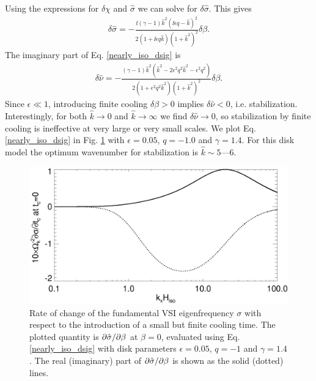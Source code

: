 Using the expressions for $\delta\chi$ and $\hat{\sigma}$ we can solve
for $\delta\hat{\sigma}$. This gives 
\begin{align}\label{nearly_iso_dsig}
  \delta \hat{\sigma} =
  -\frac{\ii\left(\gamma-1\right)\hat{k}^2\left(\ii\epsilon
      q - \hat{k}\right)^2}{2\left(1+\ii\epsilon q \hat{k}\right)\left(1+\hat{k}^2\right)^2}\delta\beta.
\end{align}
The imaginary part of Eq. \ref{nearly_iso_dsig} is
\begin{align}
  \delta\hat{\nu} =
  -\frac{\left(\gamma-1\right)\hat{k}^2 \left(\hat{k}^2 -
      2\epsilon^2q^2\hat{k}^2 - \epsilon^2q^2\right)}{2\left(1+\epsilon^2 q^2
      \hat{k}^2\right)\left(1+\hat{k}^2\right)^2}\delta\beta.  
\end{align}
Since $\epsilon \ll 1$, introducing finite cooling $\delta\beta>0$
implies $\delta\hat{\nu} < 0$, i.e. stabilization. Interestingly, for both
$\hat{k}\to0$ and $\hat{k}\to\infty$ we find $\delta\hat{\nu}\to0$, so
stabilization by finite cooling is ineffective at very large or very
small scales. We plot Eq. \ref{nearly_iso_dsig} in Fig. \ref{domegadbeta} with
$\epsilon=0.05$, $q=-1.0$ and $\gamma=1.4$. For this disk model the
optimum wavenumber for stabilization is $\hat{k}\sim 5$---$6$.  


\begin{figure}
  \includegraphics[width=\linewidth]{figures/domegadbeta}
  \caption{Rate of change of the fundamental VSI eigenfrequency
    $\sigma$ with respect to the introduction of a small but finite
    cooling time. The plotted quantity is $\partial\hat{\sigma}/\partial\beta$ at $\beta=0$, evaluated using
    Eq. \ref{nearly_iso_dsig} with 
    disk parameters $\epsilon=0.05$, $q=-1$ and $\gamma=1.4$. The real
    (imaginary) part of $\partial\hat{\sigma}/\partial\beta$ is shown as the solid
    (dotted) lines. 
    \label{domegadbeta}}  
\end{figure}   

